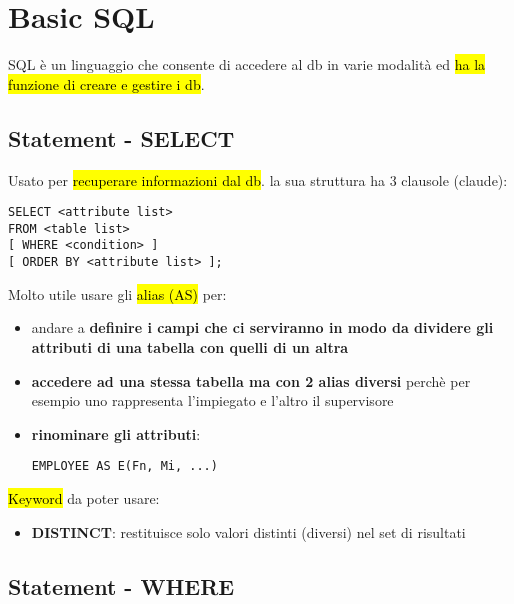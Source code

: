 \newpage
\section{Basic SQL}


SQL è un linguaggio che consente di accedere al db in varie modalità ed \hl{ha la funzione di creare e gestire i db}.


\subsection{Statement - SELECT}

Usato per \hl{recuperare informazioni dal db}. la sua struttura ha 3 clausole (claude):

\begin{lstlisting}
SELECT <attribute list>
FROM <table list>
[ WHERE <condition> ]
[ ORDER BY <attribute list> ];
\end{lstlisting}


Molto utile usare gli \hl{alias (AS)} per:

\begin{itemize}
	\item andare a \textbf{definire i campi che ci serviranno in modo da dividere gli attributi di una tabella con quelli di un altra}
	
	\item \textbf{accedere ad una stessa tabella ma con 2 alias diversi} perchè per esempio uno rappresenta l'impiegato e l'altro il supervisore
	
	\item \textbf{rinominare gli attributi}:

\begin{lstlisting}
EMPLOYEE AS E(Fn, Mi, ...)
\end{lstlisting}


\end{itemize}


\hl{Keyword} da poter usare:

\begin{itemize}
	\item \textbf{DISTINCT}: restituisce solo valori distinti (diversi) nel set di risultati
\end{itemize}


\subsection{Statement - WHERE}

